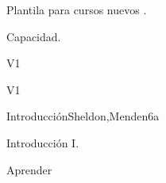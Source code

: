 
\begin{syllabus}


\begin{justification}
Plantila para cursos nuevos .
\end{justification}

\begin{goals}
\item Capacidad.
\end{goals}

\begin{outcomes}{V1}
   \item {}
\end{outcomes}

\begin{competences}{V1}
    \item {} 
\end{competences}


\begin{unit}{Introducción}{}{Sheldon,Menden}{6}{a}
\begin{topics}
      \item Introducción I.
   \end{topics}

   \begin{learningoutcomes}
      \item Aprender
   \end{learningoutcomes}
\end{unit}






\begin{coursebibliography}
\end{coursebibliography}

\end{syllabus}

